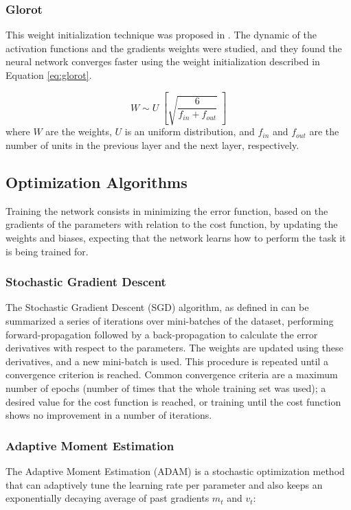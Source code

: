 \subsubsection{Glorot}
This weight initialization technique was proposed in \cite{glorot2010understanding}. The dynamic of the activation functions and the gradients weights were studied, and they found the neural network converges faster using the weight initialization described in Equation \ref{eq:glorot}.

\begin{equation}
W \sim U \; \left[\sqrt{\frac{6}{f_{in}+f_{out}}}\; \right] 
\label{eq:glorot}
\end{equation}
where $W$ are the weights, $U$ is an uniform distribution, and $f_{in}$ and $f_{out}$ are the number of units in the previous layer and the next layer, respectively.

\subsection{Optimization Algorithms}
Training the network consists in minimizing the error function, based on the gradients of the parameters with relation to the cost function, by updating the weights and biases, expecting that the network learns how to perform the task it is being trained for.

\subsubsection{Stochastic Gradient Descent}

The Stochastic Gradient Descent (SGD) algorithm, as defined in \cite{bishop2006pattern} can be summarized a series of iterations over mini-batches of the dataset, performing forward-propagation
followed by a back-propagation to calculate the error derivatives with respect to the parameters. The weights are updated using these derivatives, and a new mini-batch is used. This procedure is repeated until a convergence criterion is  reached. Common convergence criteria are a maximum number of epochs (number of times that the whole training set was used); a desired value for the cost function is reached, or training until the cost function shows no improvement in a number of iterations.

\subsubsection{Adaptive Moment Estimation}
The Adaptive Moment Estimation (ADAM) \cite{kingma2014adam} is a stochastic optimization method that can adaptively tune the learning rate per parameter and also keeps an exponentially decaying average of past gradients $m_t$ and $v_t$:

